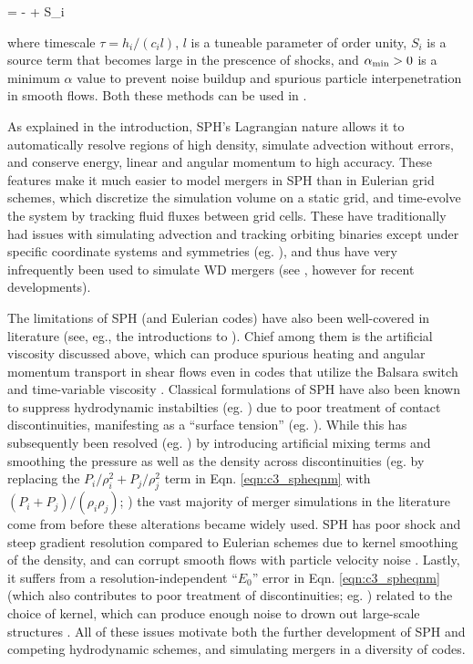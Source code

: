 \eqbegin
{} = - + S_i
\eqend

\noindent where timescale $\tau = h_i/(c_i l)$, $l$ is a tuneable parameter of order unity, $S_i$ is a source term that becomes large in the prescence of shocks, and $\alpha_\mathrm{min} > 0$ is a minimum $\alpha$ value to prevent noise buildup and spurious particle interpenetration in smooth flows.  Both these methods can be used in \gasoline.


As explained in the introduction, SPH's Lagrangian nature allows it to automatically resolve regions of high density, simulate advection without errors, and conserve energy, linear and angular momentum to high accuracy.  These features make it much easier to model mergers in SPH than in Eulerian grid schemes, which discretize the simulation volume on a static grid, and time-evolve the system by tracking fluid fluxes between grid cells.  These have traditionally had issues with simulating advection and tracking orbiting binaries except under specific coordinate systems and symmetries (eg. \citep{hopk15}), and thus have very infrequently been used to simulate WD mergers (see \cite{katz+16}, however for recent developments).

The limitations of SPH (and Eulerian codes) have also been well-covered in literature (see, eg., the introductions to \citealt{spri10, hopk15, katz+16}).  Chief among them is the artificial viscosity discussed above, which can produce spurious heating and angular momentum transport in shear flows even in codes that utilize the Balsara switch and time-variable viscosity \citep{culld10}.  Classical formulations of SPH have also been known to suppress hydrodynamic instabilties (eg. \citealt{ager+07}) due to poor treatment of contact discontinuities, manifesting as a ``surface tension'' (eg. \citealt{readha10, hesss10}).  While this has subsequently been resolved (eg. \citep{hopk13, hu+14, kell+14}) by introducing artificial mixing terms \citep{pric08} and smoothing the pressure as well as the density across discontinuities (eg. by replacing the $P_i/\rho_i^2 + P_j/\rho_j^2$ term in Eqn. \ref{eqn:c3_spheqnm} with $(P_i + P_j)/(\rho_i\rho_j)$; \citealt{kell+14}) the vast majority of merger simulations in the literature come from before these alterations became widely used.  SPH has poor shock and steep gradient resolution compared to Eulerian schemes due to kernel smoothing of the density, and can corrupt smooth flows with particle velocity noise \citep{spri10rev}.  Lastly, it suffers from a resolution-independent ``$E_0$'' error in Eqn. \ref{eqn:c3_spheqnm} (which also contributes to poor treatment of discontinuities; eg. \citealt{readha10}) related to the choice of kernel, which can produce enough noise to drown out large-scale structures \citep{hopk15}.  All of these issues motivate both the further development of SPH and competing hydrodynamic schemes, and simulating mergers in a diversity of codes.

